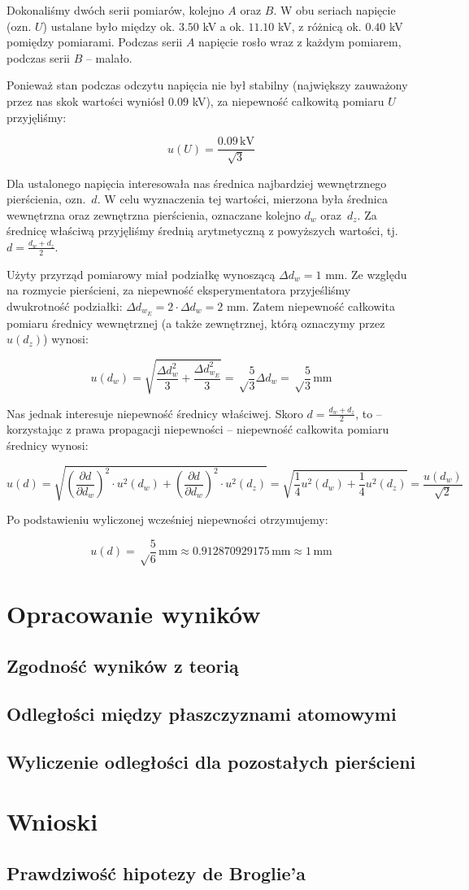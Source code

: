 \documentclass[a4paper]{article}
\newlength{\du}
\begin{document}
Dokonaliśmy dwóch serii pomiarów, kolejno $A$ oraz $B$.
W obu seriach napięcie (ozn. $U$) ustalane było między ok. $3.50$ kV a ok. $11.10$ kV, z różnicą ok. $0.40$ kV pomiędzy pomiarami.
Podczas serii $A$ napięcie rosło wraz z każdym pomiarem, podczas serii $B$ -- malało.

Ponieważ stan podczas odczytu napięcia nie był stabilny (największy zauważony przez nas skok wartości wyniósł $0.09$ kV), za niepewność całkowitą pomiaru $U$ przyjęliśmy:

$$u(U) = \frac{0.09 \, \text{kV}}{\sqrt 3}$$

Dla ustalonego napięcia interesowała nas średnica najbardziej wewnętrznego pierścienia, ozn.~$d$.
W celu wyznaczenia tej wartości, mierzona była średnica wewnętrzna oraz zewnętrzna pierścienia, oznaczane kolejno $d_w$ oraz~$d_z$.
Za średnicę właściwą przyjęliśmy średnią arytmetyczną z powyższych wartości, tj.~$d = \frac {d_w + d_z}{2}$.

Użyty przyrząd pomiarowy miał podziałkę wynoszącą $\Delta d_w = 1$ mm.
Ze względu na rozmycie pierścieni, za niepewność eksperymentatora przyjeśliśmy dwukrotność podziałki: $\Delta d_{w_E} = 2 \cdot \Delta d_w = 2$ mm.
Zatem niepewność całkowita pomiaru średnicy wewnętrznej (a także zewnętrznej, którą oznaczymy przez $u(d_z)$) wynosi:

$$u(d_w) = \sqrt{\frac{\Delta d_w^2}{3} + \frac{\Delta d_{w_E}^2}{3}} = \sqrt \frac{5}{3} \Delta d_w = \sqrt \frac{5}{3} \, \text{mm}$$

Nas jednak interesuje niepewność średnicy właściwej.
Skoro $d = \frac {d_w + d_z}{2}$, to -- korzystając z prawa propagacji niepewności -- niepewność całkowita pomiaru średnicy wynosi:

$$u(d) = \sqrt{\left(\frac{\partial d}{\partial d_w}\right)^2 \cdot u^2(d_w) + \left(\frac{\partial d}{\partial d_w}\right)^2 \cdot u^2(d_z)} = \sqrt{\frac{1}{4} u^2(d_w) + \frac{1}{4} u^2(d_z)} = \frac{u(d_w)}{\sqrt{2}}$$

Po podstawieniu wyliczonej wcześniej niepewności otrzymujemy:

$$u(d) = \sqrt \frac{5}{6} \, \text{mm} \approx 0.912870929175 \, \text{mm} \approx 1 \, \text{mm}$$

\section{Opracowanie wyników}

\subsection{Zgodność wyników z teorią}

\subsection{Odległości między płaszczyznami atomowymi}

\subsection{Wyliczenie odległości dla pozostałych pierścieni}

\section{Wnioski}

\subsection{Prawdziwość hipotezy de Broglie'a}
\end{document}
